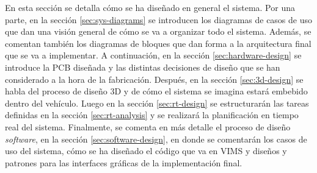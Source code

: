 En esta sección se detalla cómo se ha diseñado en general el sistema. Por una parte,
en la sección \ref{sec:sys-diagrams} se introducen los diagramas de casos de uso que dan
una visión general de cómo se va a organizar todo el sistema. Además, se comentan
también los diagramas de bloques que dan forma a la arquitectura final que se va
a implementar. A continuación, en la sección \ref{sec:hardware-design} se introduce
la PCB diseñada y las distintas decisiones de diseño que se han considerado a la hora
de la fabricación. Después, en la sección \ref{sec:3d-design} se habla del proceso
de diseño 3D y de cómo el sistema se imagina estará embebido dentro del vehículo.
Luego en la sección \ref{sec:rt-design} se estructurarán
las tareas definidas en la sección \ref{sec:rt-analysis} y se realizará la
planificación en tiempo real del sistema. Finalmente, se comenta en más detalle
el proceso de diseño \textit{software}, en la sección \ref{sec:software-design},
en donde se comentarán los casos de uso del sistema, cómo se ha diseñado el código
que va en \ac{VIMS} y diseños y patrones para las interfaces gráficas de la
implementación final.
